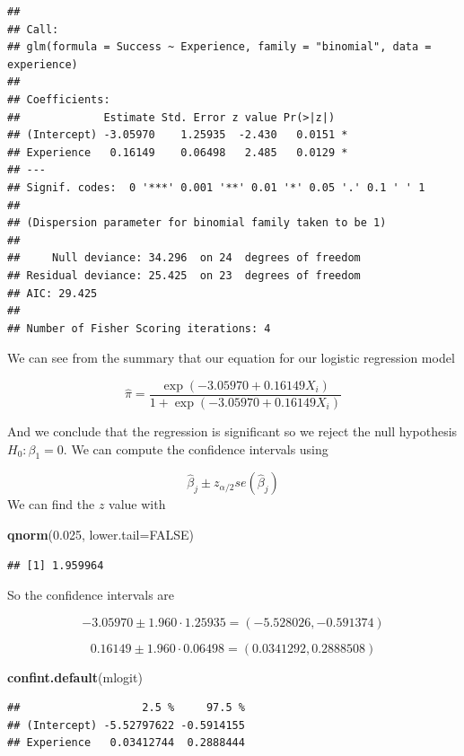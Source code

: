 \documentclass[
  11pt,
]{article}
\newenvironment{Shaded}{\begin{snugshade}}{\end{snugshade}}
\newcommand{\AttributeTok}[1]{\textcolor[rgb]{0.13,0.29,0.53}{#1}}
\newcommand{\ConstantTok}[1]{\textcolor[rgb]{0.56,0.35,0.01}{#1}}
\newcommand{\FloatTok}[1]{\textcolor[rgb]{0.00,0.00,0.81}{#1}}
\newcommand{\FunctionTok}[1]{\textcolor[rgb]{0.13,0.29,0.53}{\textbf{#1}}}
\newcommand{\NormalTok}[1]{#1}
\begin{document}
\begin{verbatim}
## 
## Call:
## glm(formula = Success ~ Experience, family = "binomial", data = experience)
## 
## Coefficients:
##             Estimate Std. Error z value Pr(>|z|)  
## (Intercept) -3.05970    1.25935  -2.430   0.0151 *
## Experience   0.16149    0.06498   2.485   0.0129 *
## ---
## Signif. codes:  0 '***' 0.001 '**' 0.01 '*' 0.05 '.' 0.1 ' ' 1
## 
## (Dispersion parameter for binomial family taken to be 1)
## 
##     Null deviance: 34.296  on 24  degrees of freedom
## Residual deviance: 25.425  on 23  degrees of freedom
## AIC: 29.425
## 
## Number of Fisher Scoring iterations: 4
\end{verbatim}

We can see from the summary that our equation for our logistic
regression model

\[\hat{\pi} = \frac{\exp(-3.05970 + 0.16149X_i)}{1 + \exp(-3.05970 + 0.16149X_i)}\]

And we conclude that the regression is significant so we reject the null
hypothesis \(H_0: \beta_1 = 0\). We can compute the confidence intervals
using

\[\hat{\beta}_j \pm z_{\alpha/2} se(\hat{\beta}_j)\] We can find the
\(z\) value with

\begin{Shaded}
\begin{Highlighting}[]
\FunctionTok{qnorm}\NormalTok{(}\FloatTok{0.025}\NormalTok{, }\AttributeTok{lower.tail=}\ConstantTok{FALSE}\NormalTok{)}
\end{Highlighting}
\end{Shaded}

\begin{verbatim}
## [1] 1.959964
\end{verbatim}

So the confidence intervals are

\[-3.05970 \pm 1.960 \cdot 1.25935 = (-5.528026, -0.591374)\]

\[0.16149 \pm 1.960 \cdot 0.06498 = (0.0341292, 0.2888508)\]

\begin{Shaded}
\begin{Highlighting}[]
\FunctionTok{confint.default}\NormalTok{(mlogit)}
\end{Highlighting}
\end{Shaded}

\begin{verbatim}
##                   2.5 %     97.5 %
## (Intercept) -5.52797622 -0.5914155
## Experience   0.03412744  0.2888444
\end{verbatim}
\end{document}
